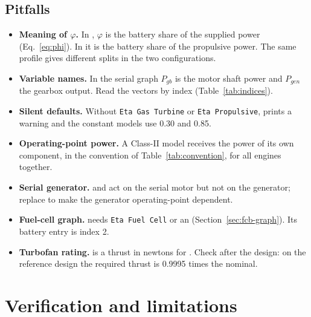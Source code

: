 \documentclass[a4paper,11pt]{article}
\begin{document}
\subsection{Pitfalls}
\begin{itemize}
\item \textbf{Meaning of $\varphi$.} In , $\varphi$ is the battery share of
  the supplied power (Eq.~\eqref{eq:phi}). In  it is the battery
  share of the propulsive power. The same profile gives different splits in the two
  configurations.
\item \textbf{Variable names.} In the serial graph $P_{gb}$ is the motor shaft power and
  $P_{gen}$ the gearbox output. Read the vectors by index (Table~\ref{tab:indices}).
\item \textbf{Silent defaults.} Without \texttt{Eta Gas Turbine} or \texttt{Eta Propulsive},
   prints a warning and the constant models use 0.30 and 0.85.
\item \textbf{Operating-point power.} A Class-II model receives the power of its own
  component, in the convention of Table~\ref{tab:convention}, for all engines together.
\item \textbf{Serial generator.}  and  act on the serial motor
  but not on the generator; replace  to make the
  generator operating-point dependent.
\item \textbf{Fuel-cell graph.}  needs \texttt{Eta Fuel Cell}
  or an  (Section~\ref{sec:fcb-graph}). Its battery entry is index 2.
\item \textbf{Turbofan rating.}  is a thrust in newtons for
  . Check  after the design: on the reference
  design the required thrust is 0.9995 times the nominal.
\end{itemize}

\section{Verification and limitations}\label{sec:verification}
\end{document}
